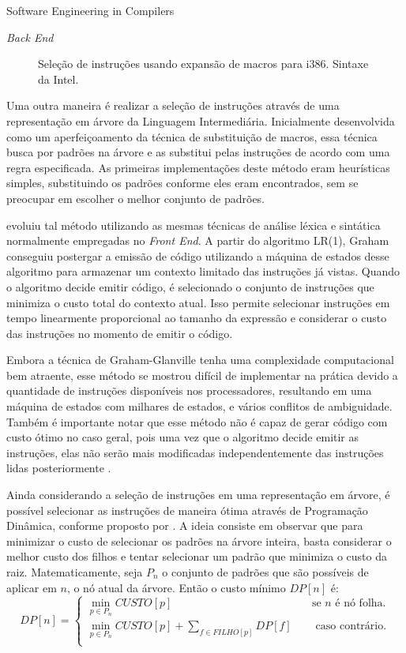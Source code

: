 \begin{section}{Software Engineering in Compilers}
\begin{subsection}{\textit{Back End}}
\begin{figure}
\caption{Seleção de instruções usando expansão de macros para i386. Sintaxe da Intel.}
\label{fig:macro_exp}
\end{figure}

Uma outra maneira é realizar a seleção de instruções através de uma
representação em árvore da Linguagem Intermediária.  Inicialmente
desenvolvida como um aperfeiçoamento da técnica de substituição de macros,
essa técnica busca por padrões na árvore e as substitui pelas instruções de
acordo com uma regra especificada.  As primeiras implementações deste
método eram heurísticas simples, substituindo os padrões conforme eles eram
encontrados, sem se preocupar em escolher o melhor conjunto de padrões.

\cite{glanville1978} evoluiu tal método utilizando as mesmas técnicas de
análise léxica e sintática normalmente empregadas no \textit{Front End}. A
partir do algoritmo LR(1), Graham conseguiu postergar a emissão de código
utilizando a máquina de estados desse algoritmo para armazenar um contexto
limitado das instruções já vistas. Quando o algoritmo decide emitir código,
é selecionado o conjunto de instruções que minimiza o custo total do
contexto atual. Isso permite selecionar instruções em tempo linearmente
proporcional ao tamanho da expressão e considerar o custo das instruções no
momento de emitir o código.

Embora a técnica de Graham-Glanville tenha uma complexidade computacional bem
atraente, esse método se mostrou difícil de implementar na prática devido a
quantidade de instruções disponíveis nos processadores, resultando em uma
máquina de estados com milhares de estados, e vários conflitos de ambiguidade.
Também é importante notar que esse método não é capaz de gerar código com custo
ótimo no caso geral, pois uma vez que o algoritmo decide emitir as instruções,
elas não serão mais modificadas independentemente das instruções lidas
posteriormente \citep{blindell2016instruction}.

Ainda considerando a seleção de instruções em uma representação em árvore,
é possível selecionar as instruções de maneira ótima através de Programação
Dinâmica, conforme proposto por \cite{ripken1977formale}.  A ideia consiste em
observar que para minimizar o custo de selecionar os padrões na árvore inteira,
basta considerar o melhor custo dos filhos
e tentar selecionar um padrão que minimiza o custo da raiz. Matematicamente, seja
$P_n$ o conjunto de padrões que são possíveis de aplicar em $n$, o nó atual da árvore.
Então o custo mínimo $DP[n]$ é:
\[
    DP[n] =
     \begin{cases}
       \min_{p \in P_n} CUSTO[p]  &\quad\text{se } n \text{ é nó folha.}\\
       \min_{p \in P_n} CUSTO[p] + \sum_{f \in FILHO[p]} DP[f] &\quad\text{ caso contrário.}\\
     \end{cases}
\]


\end{subsection}
\end{section}
